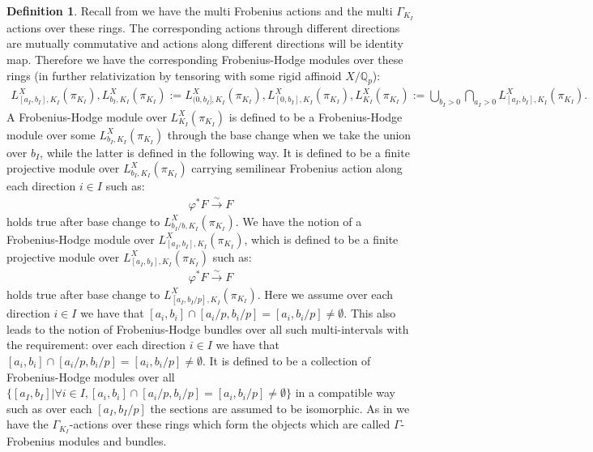 \documentclass[12pt]{article}
\theoremstyle{definition}
\newtheorem{definition}{Definition}
\begin{document}
\begin{definition} \label{definition2}
Recall from \cite{T} we have the multi Frobenius actions and the multi $\Gamma_{K_I}$ actions over these rings. The corresponding actions through different directions are mutually commutative and actions along different directions will be identity map. Therefore we have the corresponding Frobenius-Hodge modules over these rings (in further relativization by tensoring with some rigid affinoid $X/\mathbb{Q}_p$):
\begin{align}
L^X_{[a_I,b_I],K_I}(\pi_{K_I}),L^X_{b_I,K_I}(\pi_{K_I}):=L^X_{(0,b_I],K_I}(\pi_{K_I}),L^X_{[0,b_I],K_I}(\pi_{K_I}),L^X_{K_I}(\pi_{K_I}):=\bigcup_{b_I>0}\bigcap_{a_I>0}L^X_{[a_I,b_I],K_I}(\pi_{K_I}).
\end{align}
A Frobenius-Hodge module over $L^X_{K_I}(\pi_{K_I})$ is defined to be a Frobenius-Hodge module over some $L^X_{b_I,K_I}(\pi_{K_I})$ through the base change when we take the union over $b_I$, while the latter is defined in the following way. It is defined to be a finite projective module over $L^X_{b_I,K_I}(\pi_{K_I})$ carrying semilinear Frobenius action along each direction $i\in I$ such as:
\begin{align}
\varphi^*F \overset{\sim}{\rightarrow} F
\end{align}
holds true after base change to $L^X_{b_I/b,K_I}(\pi_{K_I})$. We have the notion of a Frobenius-Hodge module over $L^X_{[a_I,b_I],K_I}(\pi_{K_I})$, which is defined to be a finite projective module over  $L^X_{[a_I,b_I],K_I}(\pi_{K_I})$ such as:
\begin{align}
\varphi^*F \overset{\sim}{\rightarrow} F
\end{align}
holds true after base change to $L^X_{[a_I,b_I/p],K_I}(\pi_{K_I})$. Here we assume over each direction $i\in I$ we have that $[a_i,b_i]\cap[a_i/p,b_i/p]=[a_i,b_i/p]\neq \emptyset$. This also leads to the notion of Frobenius-Hodge bundles over all such multi-intervals with the requirement: over each direction $i\in I$ we have that $[a_i,b_i]\cap[a_i/p,b_i/p]=[a_i,b_i/p]\neq \emptyset$. It is defined to be a collection of Frobenius-Hodge modules over all $\{[a_I,b_I]|\forall i\in I, [a_i,b_i]\cap[a_i/p,b_i/p]=[a_i,b_i/p]\neq \emptyset\}$ in a compatible way such as over each $[a_I,b_I/p]$ the sections are assumed to be isomorphic. As in \cite{T} we have the $\Gamma_{K_I}$-actions over these rings which form the objects which are called $\Gamma$-Frobenius modules and bundles.
\end{definition}
\end{document}

